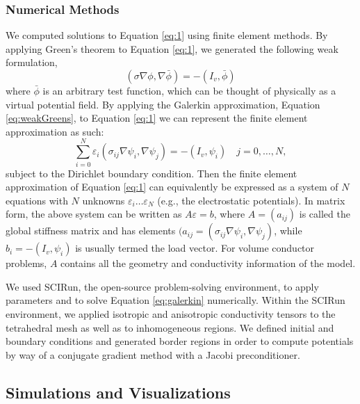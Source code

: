 \subsubsection{Numerical Methods}
\label{sec:numerical}


We computed solutions to Equation \ref{eq:1} using finite element methods. By applying Green's theorem to Equation \ref{eq:1}, we generated the following weak formulation,
\begin{equation}
\label{eq:weakGreens}
(\sigma \nabla \phi, \nabla \bar{\phi}) = -(I_v, \bar{\phi})
\end{equation}
where $ \bar{\phi}$ is an arbitrary test function, which can be thought of physically as a virtual potential field. By applying the Galerkin approximation, Equation \ref{eq:weakGreens}, to Equation \ref{eq:1} we can represent the finite element approximation as such:
\begin{equation}
\label{eq:galerkin}
\sum_{i = 0}^{N} \varepsilon_i (\sigma_{ij} \nabla \psi_{i}, \nabla \psi_{j}) = -(I_v, \psi_i) \quad j = 0, \dots, N,
\end{equation}
subject to the Dirichlet boundary condition. Then the finite element approximation of Equation \ref{eq:1} can equivalently be expressed as a system of $N$ equations with $N$ unknowns $\varepsilon_i \dots \varepsilon_N$ (e.g., the electrostatic potentials). In matrix form, the above system can be written as $A \varepsilon = b$,  where $A=(a_{ij})$ is called the global stiffness matrix and has elements $(a_{ij} = (\sigma_{ij} \nabla \psi_{i}, \nabla \psi_{j})$, while $b_i = -(I_v, \psi_i)$ is usually termed the load vector. For volume conductor problems, $A$ contains all the geometry and conductivity information of the model. \cite{ref:math}

We used SCIRun, the open-source problem-solving environment, to apply parameters and to solve Equation \ref{eq:galerkin} numerically.  Within the SCIRun environment, we applied isotropic and anisotropic conductivity tensors to the tetrahedral mesh as well as to inhomogeneous regions. We defined initial and boundary conditions and generated border regions in order to compute potentials by way of a conjugate gradient method with a Jacobi preconditioner.

\subsection{Simulations and Visualizations}
\label{sec:sim}


